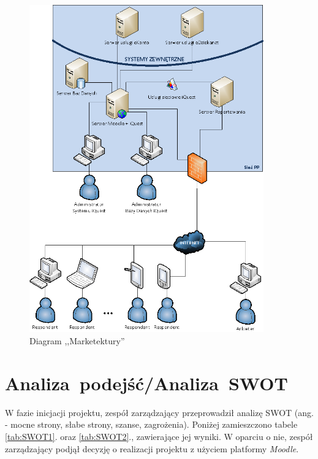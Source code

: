 \begin{figure}[H]
\centering\includegraphics[width=0.9\textwidth]{figures/marketecture}
\caption{Diagram ,,Marketektury''}\label{rys:marketecture}
\end{figure}

\section{Analiza~podejść\slash Analiza~SWOT}
\label{Chapter53}

W fazie inicjacji projektu, zespół zarządzający przeprowadził analizę SWOT (ang.  - mocne strony, słabe strony, szanse, zagrożenia). Poniżej zamieszczono tabele \ref{tab:SWOT1}. oraz \ref{tab:SWOT2}., zawierające jej wyniki. W oparciu o nie, zespół zarządzający podjął decyzję o realizacji projektu z użyciem platformy \textit{Moodle}.

